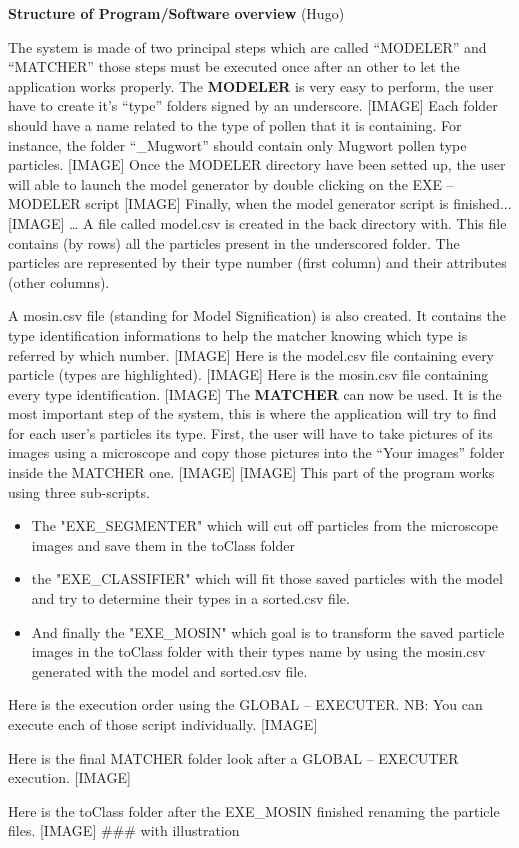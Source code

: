 \textbf{Structure of Program/Software overview} (Hugo) 

The system is made of two principal steps which are called “MODELER” and “MATCHER” those steps must be executed once after an other to let the application works properly.
The \textbf{MODELER} is very easy to perform, the user have to create it's “type” folders signed by an underscore.
[IMAGE]
Each folder should have a name related to the type of pollen that it is containing. For instance, the folder “_Mugwort” should contain only Mugwort pollen type particles.
[IMAGE]
Once the MODELER directory have been setted up, the user will able to launch the model generator by double clicking on the EXE – MODELER script
[IMAGE]
Finally, when the model generator script is finished...
[IMAGE]
… A file called model.csv is created in the back directory with. This file contains (by rows) all the particles present in the underscored folder. The particles are represented by their type number (first column) and their attributes (other columns).

A mosin.csv file (standing for Model Signification) is also created. It contains the type identification informations to help the matcher knowing which type is referred by which number.
[IMAGE]
Here is the model.csv file containing every particle (types are highlighted).
[IMAGE]
Here is the mosin.csv file containing every type identification.
[IMAGE]
The \textbf{MATCHER} can now be used. It is the most important step of the system, this is where the application will try to find for each user's particles its type.
First, the user will have to take pictures of its images using a microscope and copy those pictures into the “Your images” folder inside the MATCHER one.
[IMAGE]
[IMAGE]
This part of the program works using three sub-scripts.

\begin{itemize}
\item The "EXE_SEGMENTER" which will cut off particles from the microscope images and save them in the toClass folder

\item the "EXE_CLASSIFIER" which will fit those saved particles with the model and try to determine their types in a sorted.csv file.

\item And finally the "EXE_MOSIN" which goal is to transform the saved particle images in the toClass folder with their types name by using the mosin.csv generated with the model and sorted.csv file.
\end{itemize}

Here is the execution order using the GLOBAL – EXECUTER.
NB: You can execute each of those script individually.
[IMAGE]

Here is the final MATCHER folder look after a GLOBAL – EXECUTER execution.
[IMAGE]

Here is the toClass folder after the EXE_MOSIN finished renaming the particle files.
[IMAGE]
### with illustration
    
    
    
    
    